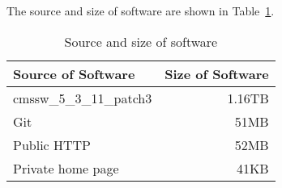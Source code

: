 \documentclass{acm_proc_article-sp}
\begin{document}
The source and size of software are shown in Table~\ref{table:software-source-size}.

\begin{table}
    \centering
    \begin{tabular}{|l|r|}
        \hline
        Source of Software & Size of Software \\ \hline
        cmssw\_5\_3\_11\_patch3 & 1.16TB \\ \hline
        Git & 51MB \\ \hline
        Public HTTP & 52MB \\ \hline
        Private home page & 41KB \\ \hline
    \end{tabular}
    \caption{Source and size of software}
    \label{table:software-source-size}
\end{table}
\end{document}
